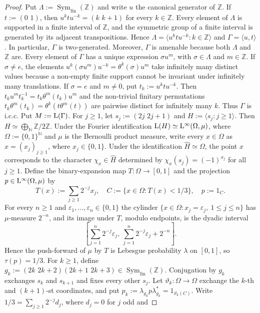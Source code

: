 \documentclass[12pt]{amsart} %
\theoremstyle{plain}
\theoremstyle{definition}
\newcommand{\N}{\mathbb{N}}
\newcommand{\Z}{\mathbb{Z}}
\newcommand{\LL}{{\rm L}}
\begin{document}
\begin{proof}
Put $\Lambda:=\operatorname{Sym}_{\mathrm{fin}}(\Z)$ and write $u$ the canonical generator of $\Z$. If $t:=(0\, \,1)$, then $u^ktu^{-k}=(k\, \, k+1)$ for every $k\in\Z$.
Every element of $\Lambda$ is supported in a finite interval of $\Z$, and
the symmetric group of a finite interval is generated by its adjacent
transpositions. Hence $\Lambda=\langle u^ktu^{-k}:k\in\Z\rangle$ and $
\Gamma=\langle u,t\rangle$. In particular, $\Gamma$ is two-generated. Moreover, $\Gamma$ is amenable because both
$\Lambda$ and $\Z$ are.
\medskip
\noindent Every element of $\Gamma$ has a unique expression $\sigma u^m$, with
$\sigma\in\Lambda$ and $m\in\Z$. If $\sigma\neq e$, the elements
$u^k(\sigma u^m)u^{-k}=\theta^k(\sigma)u^m$ take infinitely many distinct
values because a non-empty finite support cannot be invariant
under infinitely many translations. If $\sigma=e$ and $m\neq0$, put $t_k:=u^ktu^{-k}$. Then $t_ku^mt_k^{-1}=t_k\theta^m(t_k)u^m$ and the non-trivial finitary permutations
$t_k\theta^m(t_k)=\theta^k(t\theta^m(t))$ are pairwise distinct for
infinitely many $k$. Thus $\Gamma$ is i.c.c.
\medskip
\noindent Put $M:=\LL(\Gamma)$. For $j\geq1$, let $s_j:=(2j\, \, 2j+1)$ and $H:=\langle s_j:j\geq1\rangle$. Then $H\simeq\bigoplus_{\N}\Z/2\Z$. Under the Fourier identification
$\LL(H)\simeq \LL^\infty(\Omega,\mu)$, where $\Omega:=\{0,1\}^{\N}$ and $\mu$ is the Bernoulli product measure, write every $x\in\Omega$ as
$x=(x_j)_{j\geq1}$, where $x_j\in\{0,1\}$. Under the identification
$\widehat H\simeq\Omega$, the point $x$ corresponds to the character
$\chi_x\in\widehat H$ determined by $\chi_x(s_j)=(-1)^{x_j}$ for all $j\geq1$. Define the binary-expansion map $T:\Omega\to[0,1]$ and the projection
$p\in\LL^\infty(\Omega,\mu)$ by
$$
T(x):=\sum_{j\geq1}2^{-j}x_j,
\quad
C:=\{x\in\Omega:T(x)<1/3\},
\quad
p:=1_C.
$$
For every $n\geq1$ and $\varepsilon_1,\ldots,\varepsilon_n\in\{0,1\}$ the cylinder $\{x\in\Omega:x_j=\varepsilon_j,\ 1\leq j\leq n\}$ has $\mu$-measure $2^{-n}$, and its image under $T$, modulo endpoints, is
the dyadic interval
$$
\left[
\sum_{j=1}^n2^{-j}\varepsilon_j,\
\sum_{j=1}^n2^{-j}\varepsilon_j+2^{-n}
\right].
$$
Hence the push-forward of $\mu$ by $T$ is Lebesgue probability $\lambda$ on $[0,1]$, so
$\tau(p)=1/3$.
\medskip
\noindent For $k\geq1$, define
$g_k:=(2k\, \, 2k+2)(2k+1\, \, 2k+3)
\in\operatorname{Sym}_{\mathrm{fin}}(\Z)$. Conjugation by $g_k$ exchanges $s_k$ and $s_{k+1}$ and fixes every other
$s_j$. Let $\vartheta_k:\Omega\to\Omega$ exchange the $k$-th and
$(k+1)$-st coordinates, and put $p_k:=\lambda_{g_k}p\lambda_{g_k}^*=1_{\vartheta_k(C)}$. Write $1/3=\sum_{j\geq1}2^{-j}d_j$, where $d_j=0$ for $j$ odd and

\end{proof}
\end{document}
